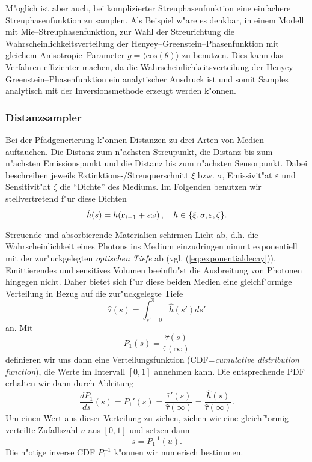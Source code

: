 	M"oglich ist aber auch, bei komplizierter Streuphasenfunktion eine einfachere Streuphasenfunktion zu samplen. Als Beispiel w"are es denkbar, in einem Modell mit Mie--Streuphasenfunktion, zur Wahl der Streurichtung die Wahrscheinlichkeitsverteilung der Henyey--Greenstein--Phasenfunktion mit gleichem Anisotropie--Parameter $g=\langle \text{cos}(\theta)\rangle$ zu benutzen. Dies kann das Verfahren effizienter machen, da die Wahrscheinlichkeitsverteilung der Henyey--Greenstein--Phasenfunktion ein analytischer Ausdruck ist und somit Samples analytisch mit der Inversionsmethode erzeugt werden k"onnen.
	
	\subsubsection{Distanzsampler}
	Bei der Pfadgenerierung k"onnen Distanzen zu drei Arten von Medien auftauchen. Die Distanz zum n"achsten Streupunkt, die Distanz bis zum n"achsten Emissionspunkt und die Distanz bis zum n"achsten Sensorpunkt. Dabei beschreiben jeweils Extinktions-/Streuquerschnitt $\xi$ bzw. $\sigma$, Emissivit"at $\varepsilon$ und Sensitivit"at $\zeta$ die ``Dichte'' des Mediums. Im Folgenden benutzen wir stellvertretend f"ur diese Dichten
	$${\hat h}(s)=h(\mathbf{r}_{i-1}+s\omega)\,,\quad h\in\{\xi,\sigma,\varepsilon,\zeta\}.$$
	
	Streuende und absorbierende Materialien schirmen Licht ab, d.h. die Wahrscheinlichkeit eines Photons ins Medium einzudringen nimmt exponentiell mit der zur"uckgelegten {\em optischen Tiefe} ab (vgl. (\ref{eq:exponentialdecay})). Emittierendes und sensitives Volumen beeinflu"st die Ausbreitung von Photonen hingegen nicht. Daher bietet sich f"ur diese beiden Medien eine gleichf"ormige Verteilung in Bezug auf die zur"uckgelegte Tiefe
	$${\hat \tau}(s)=\int_{s'=0}^s {\hat h}(s')ds'$$
	an. Mit
	$$P_1(s)=\frac{{\hat \tau}(s)}{{\hat \tau}(\infty)}$$
	definieren wir uns dann eine Verteilungsfunktion (CDF={\em cumulative distribution function}), die Werte im Intervall $[0,1]$ annehmen kann. Die entsprechende PDF erhalten wir dann durch Ableitung
	$$\frac{dP_1}{ds}(s)=P_1'(s)=\frac{{\hat \tau}'(s)}{{\hat \tau}(\infty)}=\frac{{\hat h}(s)}{{\hat \tau}(\infty)}.$$
	Um einen Wert aus dieser Verteilung zu ziehen, ziehen wir eine gleichf"ormig verteilte Zufallszahl $u$ aus $[0,1]$ und setzen dann
	$$s=P_1^{-1}(u).$$
	Die n"otige inverse CDF $P_1^{-1}$ k"onnen wir numerisch bestimmen.
	
